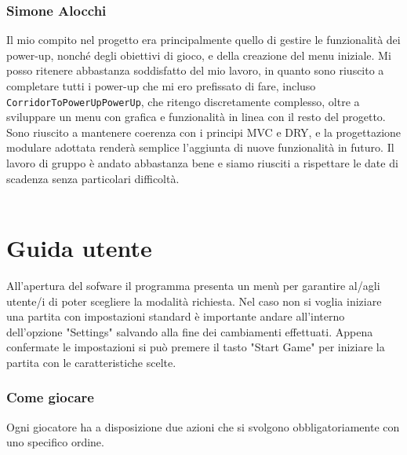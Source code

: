 \documentclass[a4paper,12pt]{report}
\begin{document}
\subsection{Simone Alocchi}
Il mio compito nel progetto era principalmente quello di gestire le funzionalità dei power-up, nonché degli obiettivi di gioco, e della creazione del menu iniziale.  
Mi posso ritenere abbastanza soddisfatto del mio lavoro, in quanto sono riuscito a completare tutti i power-up che mi ero prefissato di fare, incluso \texttt{CorridorToPowerUpPowerUp}, 
che ritengo discretamente complesso, oltre a sviluppare un menu con grafica e funzionalità in linea con il resto del progetto.  
Sono riuscito a mantenere coerenza con i principi MVC e DRY, e la progettazione modulare adottata renderà semplice l’aggiunta di nuove funzionalità in futuro.  
Il lavoro di gruppo è andato abbastanza bene e siamo riusciti a rispettare le date di scadenza senza particolari difficoltà.
\\
\\
\appendix
\chapter{Guida utente}

All'apertura del sofware il programma presenta un menù per garantire al/agli utente/i di poter scegliere la modalità richiesta. 
Nel caso non si voglia iniziare una partita con impostazioni standard è importante andare all'interno dell'opzione "Settings" salvando alla fine dei cambiamenti effettuati.
Appena confermate le impostazioni si può premere il tasto "Start Game" per iniziare la partita con le caratteristiche scelte.

\subsection*{Come giocare}

Ogni giocatore ha a disposizione due azioni che si svolgono obbligatoriamente con uno specifico ordine.
\end{document}
